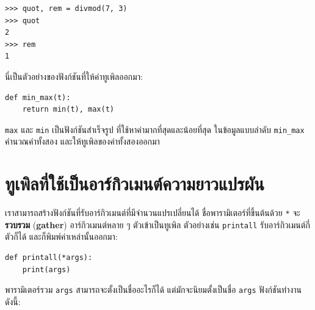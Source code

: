 \begin{verbatim}
>>> quot, rem = divmod(7, 3)
>>> quot
2
>>> rem
1
\end{verbatim}
%
นี่เป็นตัวอย่างของฟังก์ชันที่ให้ค่าทูเพิลออกมา:

\begin{verbatim}
def min_max(t):
    return min(t), max(t)
\end{verbatim}
%
\texttt{max} และ \texttt{min} เป็นฟังก์ชันสำเร็จรูป
ที่ใช้หาค่ามากที่สุดและน้อยที่สุด ในข้อมูลแบบลำดับ
\verb|min_max| คำนวณค่าทั้งสอง และให้ทูเพิลของค่าทั้งสองออกมา

\section{ทูเพิลที่ใช้เป็นอาร์กิวเมนต์ความยาวแปรผัน}
\label{gather}


เราสามารถสร้างฟังก์ชันที่รับอาร์กิวเมนต์ที่มีจำนวนแปรเปลี่ยนได้
ชื่อพารามิเตอร์ที่ขึ้นต้นด้วย \texttt{*} จะ\textbf{รวบรวม} (\textbf{gather}) อาร์กิวเมนต์หลาย ๆ ตัวเข้าเป็นทูเพิล
ตัวอย่างเช่น \texttt{printall} รับอาร์กิวเมนต์กี่ตัวก็ได้ และก็พิมพ์ค่าเหล่านั้นออกมา:


\begin{verbatim}
def printall(*args):
    print(args)
\end{verbatim}
%
พารามิเตอร์รวม \texttt{args} สามารถจะตั้งเป็นชื่ออะไรก็ได้ แต่มักจะนิยมตั้งเป็นชื่อ \texttt{args}  
ฟังก์ชันทำงานดังนี้:

